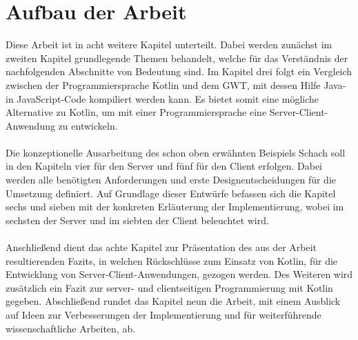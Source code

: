 \section{Aufbau der Arbeit}
Diese Arbeit ist in acht weitere Kapitel unterteilt. Dabei werden zunächst im zweiten Kapitel grundlegende Themen behandelt, welche für das Verständnis der nachfolgenden Abschnitte von Bedeutung sind. Im Kapitel drei folgt ein Vergleich zwischen der Programmiersprache Kotlin und dem \gls{GWT}, mit dessen Hilfe Java- in JavaScript-Code kompiliert werden kann. Es bietet somit eine mögliche Alternative zu Kotlin, um mit einer Programmiersprache eine Server-Client-Anwendung zu entwickeln.\\
\\
Die konzeptionelle Ausarbeitung des schon oben erwähnten Beispiels Schach soll in den Kapiteln vier für den Server und fünf für den Client erfolgen. Dabei werden alle benötigten Anforderungen und erste Designentscheidungen für die Umsetzung definiert. Auf Grundlage dieser Entwürfe befassen sich die Kapitel sechs und sieben mit der konkreten Erläuterung der Implementierung, wobei im sechsten der Server und im siebten der Client beleuchtet wird.\\
\\
Anschließend dient das achte Kapitel zur Präsentation des aus der Arbeit resultierenden Fazits, in welchen Rückschlüsse zum Einsatz von Kotlin, für die Entwicklung von Server-Client-Anwendungen, gezogen werden. Des Weiteren wird zusätzlich ein Fazit zur server- und clientseitigen Programmierung mit Kotlin gegeben.
Abschließend rundet das Kapitel neun die Arbeit, mit einem Ausblick auf Ideen zur Verbesserungen der Implementierung und für weiterführende wissenschaftliche Arbeiten, ab.